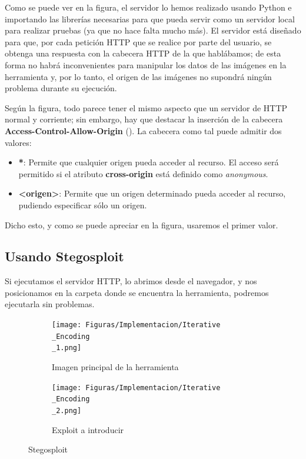 Como se puede ver en la figura, el servidor lo hemos realizado usando Python e importando las librerías necesarias para que pueda servir como un servidor local para realizar pruebas (ya que no hace falta mucho más). El servidor está diseñado para que, por cada petición HTTP que se realice por parte del usuario, se obtenga una respuesta con la cabecera HTTP de la que hablábamos; de esta forma no habrá inconvenientes para manipular los datos de las imágenes en la herramienta y, por lo tanto, el origen de las imágenes no supondrá ningún problema durante su ejecución.

Según la figura, todo parece tener el mismo aspecto que un servidor de HTTP normal y corriente; sin embargo, hay que destacar la inserción de la cabecera \textbf{Access-Control-Allow-Origin} (\cite{server-http}). La cabecera como tal puede admitir dos valores:

\begin{itemize}
\item \textbf{*}: Permite que cualquier origen pueda acceder al recurso. El acceso será permitido si el atributo \textbf{cross-origin} está definido como \textit{anonymous}.
\item \textbf{<origen>}: Permite que un origen determinado pueda acceder al recurso, pudiendo especificar sólo un origen.
\end{itemize}

Dicho esto, y como se puede apreciar en la figura, usaremos el primer valor.

\subsection{Usando Stegosploit}

Si ejecutamos el servidor HTTP, lo abrimos desde el navegador, y nos posicionamos en la carpeta donde se encuentra la herramienta, podremos ejecutarla sin problemas.

\begin{figure}[H]
  \centering
  \begin{subfigure}[H]{0.45\linewidth}
  	\texttt{[image: Figuras/Implementacion/Iterative\\\_Encoding\\\_1.png]}
  	\label{fig:iter-encod}
  	\caption{Imagen principal de la herramienta}
  \end{subfigure}
  \begin{subfigure}[H]{0.45\linewidth}
  	\texttt{[image: Figuras/Implementacion/Iterative\\\_Encoding\\\_2.png]}
  	\label{fig:iter-encod-2}
  	\caption{Exploit a introducir}
  \end{subfigure}
  \caption{Stegosploit}
\end{figure}

